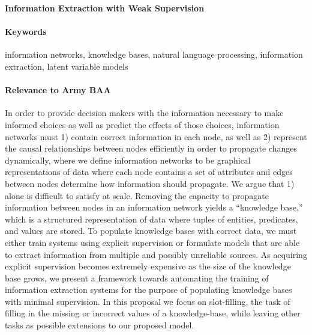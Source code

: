 \documentclass[11pt]{article}
\begin{document}

\begin{center}
\textbf{Information Extraction with Weak Supervision}
\end{center}

\begin{comment}
Spectrum from hard attention => hard segmental => HSMM for generative model, coverage / recall
Should we go into HSMM??? or is hard segmental attention enough

composition function = categorical over two entries of x

structured attention for IE posterior?
\end{comment}

\paragraph{Keywords}
information networks, knowledge bases, natural language processing, information extraction,
latent variable models

\paragraph{Relevance to Army BAA}
In order to provide decision makers with the information
necessary to make informed choices as well as predict the effects of those choices,
information networks must
1) contain correct information in each node, as well as 
2) represent the causal relationships between nodes efficiently in order to propagate changes dynamically,
where we define information networks to be graphical representations of data where each node contains
a set of attributes and edges between nodes determine how information should propagate.
We argue that 1) alone is difficult to satisfy at scale.
Removing the capacity to propagate information between nodes in an 
information network yields a ``knowledge base,'' which is a structured representation of data
where tuples of entities, predicates, and values are stored.
To populate knowledge bases with correct data,
we must either train systems using explicit supervision or
formulate models that are able to extract information from multiple and
possibly unreliable sources.
As acquiring explicit supervision becomes extremely expensive as the size
of the knowledge base grows,
we present a framework towards automating the
training of information extraction systems for the purpose of 
populating knowledge bases with minimal supervision.
In this proposal we focus on slot-filling, the task of filling in the missing or incorrect values of a knowledge-base,
while leaving other tasks as possible extensions to our proposed model.
\end{document}
